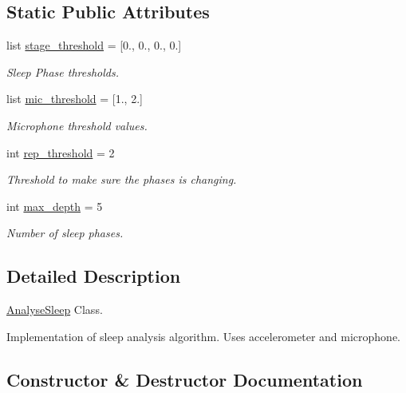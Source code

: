 \subsection*{Static Public Attributes}
\begin{DoxyCompactItemize}
\item 
list \mbox{\hyperlink{class_analyse_sleep_1_1_analyse_sleep_a2629157f9258b573b5e7511f60f96d28}{stage\+\_\+threshold}} = \mbox{[}0., 0., 0., 0.\mbox{]}
\begin{DoxyCompactList}\small\item\em Sleep Phase thresholds. \end{DoxyCompactList}\item 
list \mbox{\hyperlink{class_analyse_sleep_1_1_analyse_sleep_aabef9d1402df081df65bc01bf57b937c}{mic\+\_\+threshold}} = \mbox{[}1., 2.\mbox{]}
\begin{DoxyCompactList}\small\item\em Microphone threshold values. \end{DoxyCompactList}\item 
int \mbox{\hyperlink{class_analyse_sleep_1_1_analyse_sleep_abdf7b099c5aa3b3ef80b6294bbeb2312}{rep\+\_\+threshold}} = 2
\begin{DoxyCompactList}\small\item\em Threshold to make sure the phases is changing. \end{DoxyCompactList}\item 
int \mbox{\hyperlink{class_analyse_sleep_1_1_analyse_sleep_a0cf6f530b6c789a7d7a02356d36b10fb}{max\+\_\+depth}} = 5
\begin{DoxyCompactList}\small\item\em Number of sleep phases. \end{DoxyCompactList}\end{DoxyCompactItemize}


\subsection{Detailed Description}
\mbox{\hyperlink{class_analyse_sleep_1_1_analyse_sleep}{Analyse\+Sleep}} Class. 

Implementation of sleep analysis algorithm. Uses accelerometer and microphone. 

\subsection{Constructor \& Destructor Documentation}
\mbox{\label{class_analyse_sleep_1_1_analyse_sleep_a16f9c6a130cd45c58550943b31f11e8d}} 
